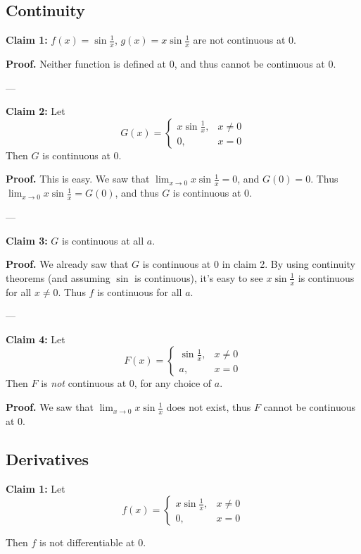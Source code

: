 \subsection{Continuity}

\textbf{Claim 1:} $f(x)=\sin \frac{1}{x}$, $g(x)=x\sin \frac{1}{x}$
are not continuous at $0$.

\textbf{Proof.} Neither function is defined at $0$, and thus cannot be
continuous at $0$.

\vs---\vs

\textbf{Claim 2:} Let
\[G(x)=\begin{cases}
  x\sin \frac{1}{x},&x\neq0\\
  0,&x=0
\end{cases}\]
Then $G$ is continuous at $0$. 

\vs

\textbf{Proof.} This is easy. We saw that $\lim_{x\to0}x\sin
\frac{1}{x}=0$, and $G(0)=0$. Thus $\lim_{x\to0}x\sin
\frac{1}{x}=G(0)$, and thus $G$  is continuous at $0$.

\vs---\vs

\textbf{Claim 3:} $G$ is continuous at all $a$.

\textbf{Proof.} We already saw that $G$ is continuous at $0$ in claim
2. By using continuity theorems (and assuming $\sin$ is continuous),
it's easy to see $x\sin \frac{1}{x}$ is continuous for all $x\neq0$. Thus
$f$ is continuous for all $a$.

\vs---\vs

\textbf{Claim 4:} Let
\[F(x)=\begin{cases}
  \sin \frac{1}{x},&x\neq0\\
  a,&x=0
\end{cases}\]
Then $F$ is \textit{not} continuous at $0$, for any choice of $a$.

\vs

\textbf{Proof.} We saw that $\lim_{x\to0}x\sin \frac{1}{x}$ does not
exist, thus $F$ cannot be continuous at $0$.

\subsection{Derivatives}

\textbf{Claim 1:} Let
\[f(x)=\begin{cases}
  x\sin \frac{1}{x},&x\neq0\\
  0,&x=0
\end{cases}\]

Then $f$ is not differentiable at $0$.

